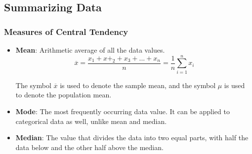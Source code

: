 \documentclass{article}
\theoremstyle{plain}
\theoremstyle{definition}
\begin{document}
\subsection{Summarizing Data}
\subsubsection{Measures of Central Tendency}
\begin{itemize}
    \item \textbf{Mean}: Arithmetic average of all the data values.
    \begin{equation}
        \overline{x} = \frac{x_1 + x+_2 + x_3 + ... + x_n}{n} = \frac{1}{n}\sum_{i=1}^{n} x_i
    \end{equation}
    
    The symbol $\overline{x}$ is used to denote the sample mean, and the symbol $\mu$ is used to denote the population mean. 
    
    \item \textbf{Mode}: The most frequently occurring data value. It can be applied to categorical data as well, unlike mean and median.
    
    \item \textbf{Median}: The value that divides the data into two equal parts, with half the data below and the other half above the median. 

\end{itemize}
\end{document}

